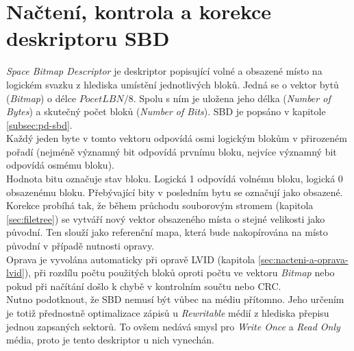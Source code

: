 \section{Načtení, kontrola a korekce deskriptoru SBD}
\label{sec:nacteni-a-oprava-sbd}
\textit{Space Bitmap Descriptor} je deskriptor popisující volné a obsazené místo na logickém svazku z hlediska umístění jednotlivých bloků. Jedná se o vektor bytů (\textit{Bitmap}) o délce $PocetLBN / 8$. Spolu s ním je uložena jeho délka (\textit{Number of Bytes}) a skutečný počet bloků (\textit{Number of Bits}). SBD je popsáno v kapitole \ref{subsec:pd-sbd}.\\ 
Každý jeden byte v tomto vektoru odpovídá osmi logickým blokům v přirozeném pořadí (nejméně významný bit odpovídá prvnímu bloku, nejvíce významný bit odpovídá osmému bloku).\\
Hodnota bitu označuje stav bloku. Logická 1 odpovídá volnému bloku, logická 0 obsazenému bloku. Přebývající bity v posledním bytu se označují jako obsazené.\\
Korekce probíhá tak, že během průchodu souborovým stromem (kapitola \ref{sec:filetree}) se vytváří nový vektor obsazeného místa o stejné velikosti jako původní. Ten slouží jako referenční mapa, která bude nakopírována na místo původní v případě nutnosti opravy.\\
Oprava je vyvolána automaticky při opravě LVID (kapitola \ref{sec:nacteni-a-oprava-lvid}), při rozdílu počtu použitých bloků oproti počtu ve vektoru \textit{Bitmap} nebo pokud při načítání došlo k chybě v kontrolním součtu nebo CRC.\\
Nutno podotknout, že SBD nemusí být vůbec na médiu přítomno. Jeho určením je totiž přednostně optimalizace zápisů u \textit{Rewritable} médií z hlediska přepisu jednou zapsaných sektorů. To ovšem nedává smysl pro \textit{Write Once} a \textit{Read Only} média, proto je tento deskriptor u nich vynechán.

